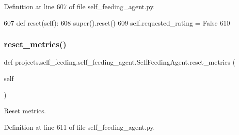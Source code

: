 Definition at line 607 of file self\+\_\+feeding\+\_\+agent.\+py.


\begin{DoxyCode}
607     \textcolor{keyword}{def }reset(self):
608         super().reset()
609         self.requested\_rating = \textcolor{keyword}{False}
610 
\end{DoxyCode}
\mbox{\label{classprojects_1_1self__feeding_1_1self__feeding__agent_1_1SelfFeedingAgent_ada3fee611be323fc660f634f7e33d83e}} 
\subsubsection{\texorpdfstring{reset\+\_\+metrics()}{reset\_metrics()}}
{\footnotesize\ttfamily def projects.\+self\+\_\+feeding.\+self\+\_\+feeding\+\_\+agent.\+Self\+Feeding\+Agent.\+reset\+\_\+metrics (\begin{DoxyParamCaption}\item[{}]{self }\end{DoxyParamCaption})}

\begin{DoxyVerb}Reset metrics.
\end{DoxyVerb}
 

Definition at line 611 of file self\+\_\+feeding\+\_\+agent.\+py.


